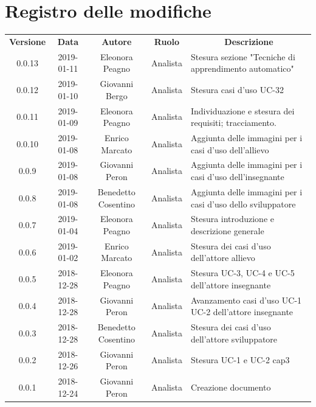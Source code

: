 \documentclass[11pt,a4paper]{article}
\begin{document}
	
	
	\newpage
	\section*{\centering Registro delle modifiche}
	\begin{tabularx}{\textwidth}{  c | c | c | c | X }
		\rowcolor{LightBlue}
		\color{white}\bfseries Versione & \color{white}\bfseries Data & \color{white}\bfseries Autore & \color{white}\bfseries Ruolo & \multicolumn{1}{c}{\color{white}\bfseries Descrizione}\\[0.25cm]
		0.0.13 & 2019-01-11 & Eleonora Peagno & Analista & Stesura sezione "Tecniche di apprendimento automatico" \\ \hline
		0.0.12 & 2019-01-10 & Giovanni Bergo & Analista & Stesura casi d'uso UC-32 \\ \hline
		0.0.11 & 2019-01-09 & Eleonora Peagno & Analista & Individuazione e stesura dei requisiti; tracciamento. \\ \hline
		0.0.10 & 2019-01-08 & Enrico Marcato & Analista & Aggiunta delle immagini per i casi d'uso dell'allievo\\ \hline
		0.0.9 & 2019-01-08 & Giovanni Peron & Analista & Aggiunta delle immagini per i casi d'uso dell'insegnante\\ \hline
		0.0.8 & 2019-01-08 & Benedetto Cosentino & Analista & Aggiunta delle immagini per i casi d'uso dello sviluppatore\\ \hline
		0.0.7 & 2019-01-04 & Eleonora Peagno & Analista & Stesura introduzione e descrizione generale\\ \hline
		0.0.6 & 2019-01-02 & Enrico Marcato & Analista & Stesura dei casi d'uso dell'attore allievo\\ \hline
		0.0.5 & 2018-12-28 & Eleonora Peagno & Analista & Stesura UC-3, UC-4 e UC-5 dell'attore insegnante\\ \hline
		0.0.4 & 2018-12-28 & Giovanni Peron & Analista & Avanzamento casi d'uso UC-1 UC-2 dell'attore insegnante\\ \hline
		0.0.3 & 2018-12-28 & Benedetto Cosentino & Analista & Stesura dei casi d'uso dell'attore sviluppatore\\ \hline
		0.0.2 & 2018-12-26 & Giovanni Peron & Analista & Stesura UC-1 e UC-2 cap3\\ \hline
		0.0.1 & 2018-12-24 & Giovanni Peron & Analista & Creazione documento\\ \hline
	\end{tabularx}
	\newpage
	\tableofcontents
	\listoffigures
	\listoftables
	\newpage	
\end{document}
